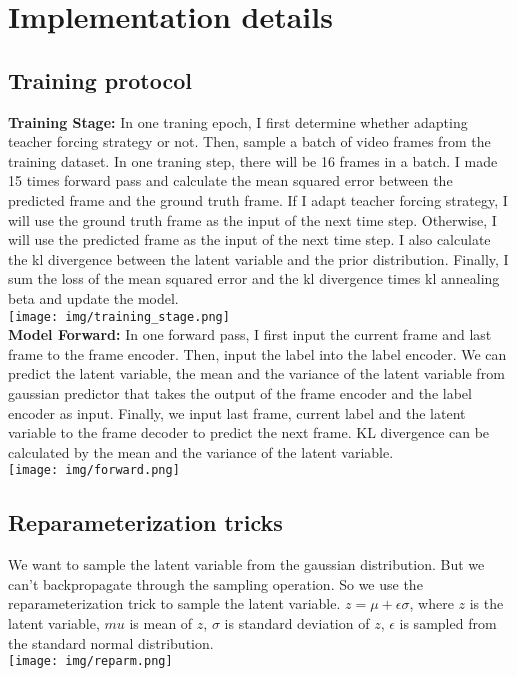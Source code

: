 \documentclass{article} %
\begin{document}
    \section{Implementation details}
    \subsection{Training protocol}
    \textbf{Training Stage:}
    In one traning epoch, I first determine whether adapting teacher forcing strategy or not. 
    Then, sample a batch of video frames from the training dataset.
    In one traning step, there will be 16 frames in a batch.
    I made 15 times forward pass and calculate the mean squared error between the predicted frame and the ground truth frame.
    If I adapt teacher forcing strategy, I will use the ground truth frame as the input of the next time step.
    Otherwise, I will use the predicted frame as the input of the next time step.
    I also calculate the kl divergence between the latent variable and the prior distribution.
    Finally, I sum the loss of the mean squared error and the kl divergence times kl annealing beta and update the model.\\
    \texttt{[image: img/training\_stage.png]}\\\textbf{Model Forward:}
    In one forward pass, I first input the current frame and last frame to the frame encoder.
    Then, input the label into the label encoder. 
    We can predict the latent variable, the mean and the variance of the latent variable from gaussian predictor that takes the output of the frame encoder and the label encoder as input.
    Finally, we input last frame, current label and the latent variable to the frame decoder to predict the next frame.
    KL divergence can be calculated by the mean and the variance of the latent variable.\\
    \texttt{[image: img/forward.png]}

    
    \subsection{Reparameterization tricks}
    We want to sample the latent variable from the gaussian distribution. But we can't backpropagate through the sampling operation.
    So we use the reparameterization trick to sample the latent variable. 
    $z = \mu + \epsilon \sigma$, where $z$ is the latent variable, $mu$ is mean of $z$, $\sigma$ is standard deviation of $z$, $\epsilon$ is sampled from the standard normal distribution. \\
    \texttt{[image: img/reparm.png]}\\
    
\end{document}
